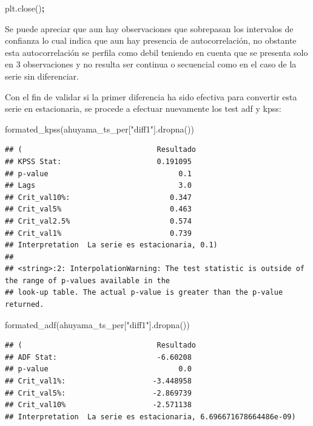 \documentclass[
]{book}
\newenvironment{Shaded}{\begin{snugshade}}{\end{snugshade}}
\newcommand{\NormalTok}[1]{#1}
\newcommand{\OperatorTok}[1]{\textcolor[rgb]{0.81,0.36,0.00}{\textbf{#1}}}
\newcommand{\StringTok}[1]{\textcolor[rgb]{0.31,0.60,0.02}{#1}}
\begin{document}
\begin{Shaded}
\begin{Highlighting}[]
\NormalTok{plt.close()}\OperatorTok{;}
\end{Highlighting}
\end{Shaded}

Se puede apreciar que aun hay observaciones que sobrepasan los intervalos de confianza lo cual indica que aun hay presencia de autocorrelación, no obstante esta autocorrelación se perfila como debil teniendo en cuenta que se presenta solo en 3 observaciones y no resulta ser continua o secuencial como en el caso de la serie sin diferenciar.

Con el fin de validar si la primer diferencia ha sido efectiva para convertir esta serie en estacionaria, se procede a efectuar nuevamente los test adf y kpss:

\begin{Shaded}
\begin{Highlighting}[]
\NormalTok{formated\_kpss(ahuyama\_ts\_per[}\StringTok{"diff1"}\NormalTok{].dropna())}
\end{Highlighting}
\end{Shaded}

\begin{verbatim}
## (                               Resultado
## KPSS Stat:                      0.191095
## p-value                              0.1
## Lags                                 3.0
## Crit_val10%:                       0.347
## Crit_val5%                         0.463
## Crit_val2.5%                       0.574
## Crit_val1%                         0.739
## Interpretation  La serie es estacionaria, 0.1)
## 
## <string>:2: InterpolationWarning: The test statistic is outside of the range of p-values available in the
## look-up table. The actual p-value is greater than the p-value returned.
\end{verbatim}

\begin{Shaded}
\begin{Highlighting}[]
\NormalTok{formated\_adf(ahuyama\_ts\_per[}\StringTok{"diff1"}\NormalTok{].dropna())}
\end{Highlighting}
\end{Shaded}

\begin{verbatim}
## (                               Resultado
## ADF Stat:                       -6.60208
## p-value                              0.0
## Crit_val1%:                    -3.448958
## Crit_val5%:                    -2.869739
## Crit_val10%                    -2.571138
## Interpretation  La serie es estacionaria, 6.696671678664486e-09)
\end{verbatim}
\end{document}
